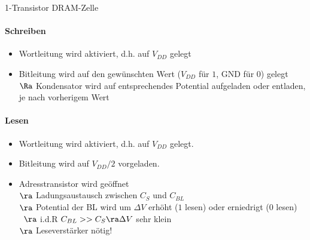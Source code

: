 1-Transistor DRAM-Zelle

\paragraph{Schreiben}
	\begin{itemize}
		\item Wortleitung wird aktiviert, d.h. auf $V_{DD}$ gelegt
		\item Bitleitung wird auf den gewünschten Wert ($V_{DD}$ für $1$, GND für $0$) gelegt \\
		$\Ra$ Kondensator wird auf entsprechendes Potential aufgeladen oder entladen, je nach vorherigem Wert
	\end{itemize}
	
\paragraph{Lesen}
\begin{itemize}
	\item Wortleitung wird aktiviert, d.h. auf $V_{DD}$ gelegt. 
	\item Bitleitung wird auf $V_{DD} / 2$ vorgeladen.
	\item Adresstransistor wird geöffnet \\
	$\ra$ Ladungsaustausch zwischen $C_S$ und $C_{BL}$ \\
	$\ra$ Potential der BL wird um $\Delta V$ erhöht ($1$ lesen) oder erniedrigt ($0$ lesen) \\\
	$\ra$ i.d.R $C_{BL} >> C_S \ra \Delta V$ sehr klein \\
	$\ra $ Leseverstärker nötig!
\end{itemize}